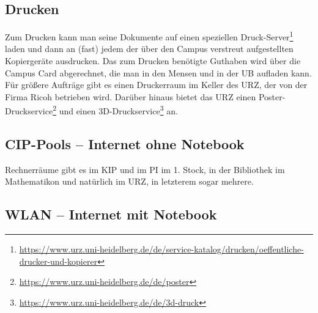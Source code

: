 \vspace*{-2mm}
\subsection{Drucken}
\vspace*{-1mm}
Zum Drucken kann man seine Dokumente auf einen speziellen Druck-Server\footnote{\url{https://www.urz.uni-heidelberg.de/de/service-katalog/drucken/oeffentliche-drucker-und-kopierer}} laden und dann an (fast) jedem der über den Campus verstreut aufgestellten Kopiergeräte ausdrucken. Das zum Drucken benötigte Gut\-ha\-ben wird über die Campus Card abgerechnet, die man in den Mensen und in der \gls{UB} aufladen kann. Für größere Aufträge gibt es einen Druckerraum im Keller des \gls{URZ}, der von der Firma Ricoh betrieben wird. Darüber hinaus bietet das URZ einen Poster-Druckservice\footnote{\url{https://www.urz.uni-heidelberg.de/de/poster}} und einen 3D-Druckservice\footnote{\url{https://www.urz.uni-heidelberg.de/de/3d-druck}} an.

\vspace*{-2mm}
\subsection{CIP-Pools -- Internet ohne Notebook}
\vspace*{-1mm}
Rechnerräume gibt es im \gls{KIP} und im \gls{PI} im 1. Stock, in der Bibliothek im \gls{Mathematikon} und natürlich im \gls{URZ}, in letzterem sogar mehrere. 
 \newpage

\subsection{WLAN -- Internet mit Notebook}

\begin{figure}[h]
    \centering
    \vspace{-5mm}

    \vspace{-5mm}

\end{figure}



